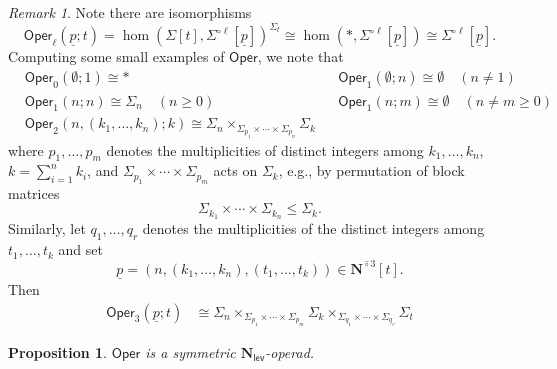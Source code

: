 \documentclass[11pt]{amsart}
\newtheorem{proposition}[subsection]{Proposition}
\theoremstyle{definition}
\theoremstyle{remark}
\newtheorem{remark}[subsection]{Remark}
\newcommand{\Oper}{\mathsf{Oper}}
\newcommand{\pt}{*}
\newcommand{\Ncirc}[1]{\mathbf{N}^{\hat{\circ}#1}}
\newcommand{\Nl}{\mathbf{N}_{\mathsf{lev}}}
\begin{document}
\begin{remark}
    Note there are isomorphisms \begin{equation} \label{eq:oper-iso} \Oper_{\ell} (\underline{p};t)=\hom \left(\Sigma[t], \Sigma^{\circ \ell}[\underline{p}] \right)^{\Sigma_t} \cong \hom \left(\pt, \Sigma^{\circ \ell} [\underline{p}] \right) \cong \Sigma^{\circ \ell} [\underline{p}].\end{equation}
    Computing some small examples of $\Oper$, we note that 
    \begin{align*} 
    &\Oper_0(\emptyset;1) \cong * && \Oper_1(\emptyset;n) \cong \emptyset \quad (n \neq 1)
    \\
    &\Oper_1(n;n) \cong \Sigma_n \quad (n \geq 0) &&  \Oper_1(n;m)\cong \emptyset \quad (n\neq m \geq 0)
    \\
    &\Oper_2\left(n, (k_1,\dots,k_n);k\right)  \cong \Sigma_n \times_{\Sigma_{p_1}\times \cdots \times \Sigma_{p_n}} \Sigma_{k}  
\end{align*}
where $p_1,\dots,p_m$ denotes the multiplicities of distinct integers among $k_1,\dots,k_n$, $k=\sum_{i=1}^n k_i$, and $\Sigma_{p_1}\times \cdots \times \Sigma_{p_m}$ acts on $\Sigma_k$, e.g.,  by permutation of block matrices \[\Sigma_{k_1} \times \cdots \times \Sigma_{k_n} \leq \Sigma_k.\] Similarly, let $q_1,\dots,q_r$ denotes the multiplicities of the distinct integers among $t_1,\dots,t_k$ and set \[\underline{p} = (n, (k_1,\dots,k_n), (t_1,\dots,t_k)) \in \Ncirc{3}[t].\]  Then \begin{align*}
    \Oper_3(\underline{p};t) & \cong  \Sigma_n \times_{\Sigma_{p_1}\times \cdots \times \Sigma_{p_m}} \Sigma_k \times_{\Sigma_{q_1}\times \cdots \times \Sigma_{q_r}} \Sigma_t %
    \end{align*} 
\end{remark}

\begin{proposition} \label{prop:Oper-is-Nl}
    $\Oper$ is a symmetric $\Nl$-operad.
\end{proposition} 
\end{document}
